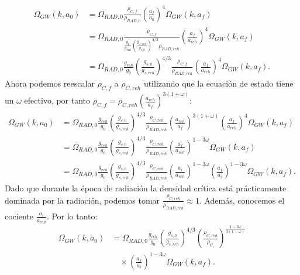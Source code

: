 \begin{equation*}
    \begin{split}
        \Omega_{GW} (k, a_0) &= \Omega_{RAD,0} \frac{\rho_{C,f}}{\rho_{RAD,0}} \left( \frac{a_f}{a_0} \right)^4 \Omega_{GW} \left( k, a_f \right)\\
        &= \Omega_{RAD,0} \frac{\rho_{C,f}}{\frac{g_0}{g_{reh}} \left( \frac{g_{s,reh}}{g_{s,0}} \right)^{4/3} \rho_{RAD,reh}} \left( \frac{a_f}{a_{reh}} \right)^4 \Omega_{GW} \left( k, a_f \right)\\
        &= \Omega_{RAD,0} \frac{g_{reh}}{g_{0}} \left( \frac{g_{s,0}}{g_{s,reh}} \right)^{4/3} \frac{\rho_{C,f}}{\rho_{RAD,reh}} \left( \frac{a_f}{a_{reh}} \right)^4 \Omega_{GW} \left( k, a_f \right).
    \end{split}
\end{equation*}
Ahora podemos reescalar $\rho_{C,f}$ a $\rho_{C,reh}$ utilizando que la ecuación de estado tiene un $\omega$ efectivo, por tanto $\displaystyle \rho_{C,f} = \rho_{C,reh} \left( \frac{a_{reh}}{a_f} \right)^{3(1 + \omega)}$:
\begin{equation*}
    \begin{split}
        \Omega_{GW} (k, a_0) &= \Omega_{RAD,0} \frac{g_{reh}}{g_{0}} \left( \frac{g_{s,0}}{g_{s,reh}} \right)^{4/3} \frac{\rho_{C,reh}}{\rho_{RAD,reh}} \left( \frac{a_{reh}}{a_{f}} \right)^{3(1 + \omega)} \left( \frac{a_f}{a_{reh}} \right)^4 \Omega_{GW} \left( k, a_f \right)\\
        &= \Omega_{RAD,0} \frac{g_{reh}}{g_{0}} \left( \frac{g_{s,0}}{g_{s,reh}} \right)^{4/3} \frac{\rho_{C,reh}}{\rho_{RAD,reh}} \left( \frac{a_{f}}{a_{reh}} \right)^{1 - 3 \omega} \Omega_{GW} \left( k, a_f \right)\\
        &= \Omega_{RAD,0} \frac{g_{reh}}{g_{0}} \left( \frac{g_{s,0}}{g_{s,reh}} \right)^{4/3} \frac{\rho_{C,reh}}{\rho_{RAD,reh}} \left( \frac{a_i}{a_{reh}} \right)^{1 - 3 \omega} \left( \frac{a_{f}}{a_{i}} \right)^{1 - 3 \omega} \Omega_{GW} \left( k, a_f \right).
    \end{split}
\end{equation*}
Dado que durante la época de radiación la densidad crítica está prácticamente dominada por la radiación, podemos tomar $\displaystyle \frac{\rho_{C,reh}}{\rho_{RAD,reh}} \approx 1$. Además, conocemos el cociente $\displaystyle \frac{a_i}{a_{reh}}$. Por lo tanto:
\begin{equation*}
    \begin{split}
        \Omega_{GW} (k, a_0) &= \Omega_{RAD,0} \frac{g_{reh}}{g_{0}} \left( \frac{g_{s,0}}{g_{s,reh}} \right)^{4/3} \left( \frac{\rho_{C,reh}}{\rho_{C_i}} \right)^{\frac{1 - 3 \omega}{3 (1 + \omega)}} \\
        &\quad \times \left( \frac{a_{f}}{a_{i}} \right)^{1 - 3 \omega} \Omega_{GW} \left( k, a_f \right).
    \end{split}
\end{equation*}
